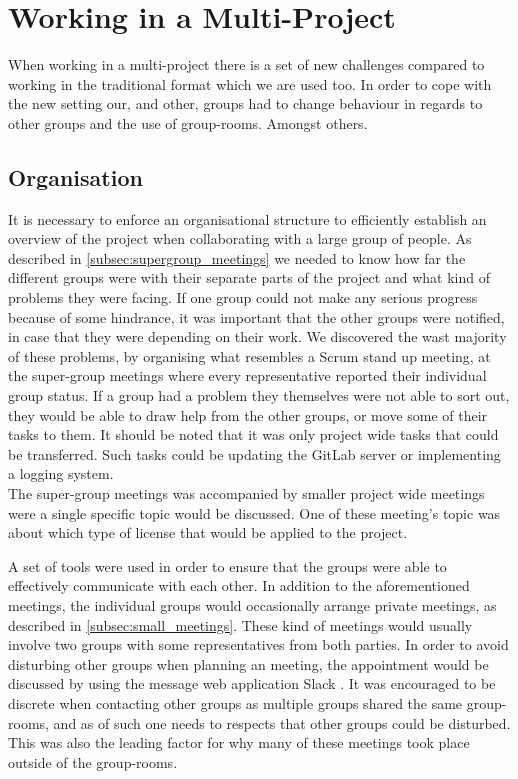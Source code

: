 \section{Working in a Multi-Project}
When working in a multi-project there is a set of new challenges compared to working in the traditional format which we are used too. In order to cope with the new setting our, and other, groups had to change behaviour in regards to other groups and the use of group-rooms. Amongst others.

\subsection{Organisation}
It is necessary to enforce an organisational structure to efficiently establish an overview of the project when collaborating with a large group of people. As described in \cref{subsec:supergroup_meetings} we needed to know how far the different groups were with their separate parts of the project and what kind of problems they were facing. If one group could not make any serious progress because of some hindrance, it was important that the other groups were notified, in case that they were depending on their work. We discovered the wast majority of these problems, by organising what resembles a Scrum stand up meeting, at the super-group meetings where every representative reported their individual group status. If a group had a problem they themselves were not able to sort out, they would be able to draw help from the other groups, or move some of their tasks to them. It should be noted that it was only project wide tasks that could be transferred. Such tasks could be updating the GitLab server or implementing a logging system. \\
The super-group meetings was accompanied by smaller project wide meetings were a single specific topic would be discussed. One of these meeting's topic was about which type of license that would be applied to the project.

A set of tools were used in order to ensure that the groups were able to effectively communicate with each other. In addition to the aforementioned meetings, the individual groups would occasionally arrange private meetings, as described in \cref{subsec:small_meetings}. These kind of meetings would usually involve two groups with some representatives from both parties. In order to avoid disturbing other groups when planning an meeting, the appointment would be discussed by using the message web application Slack \cite{slack}. It was encouraged to be discrete when contacting other groups as multiple groups shared the same group-rooms, and as of such one needs to respects that other groups could be disturbed. This was also the leading factor for why many of these meetings took place outside of the group-rooms.

